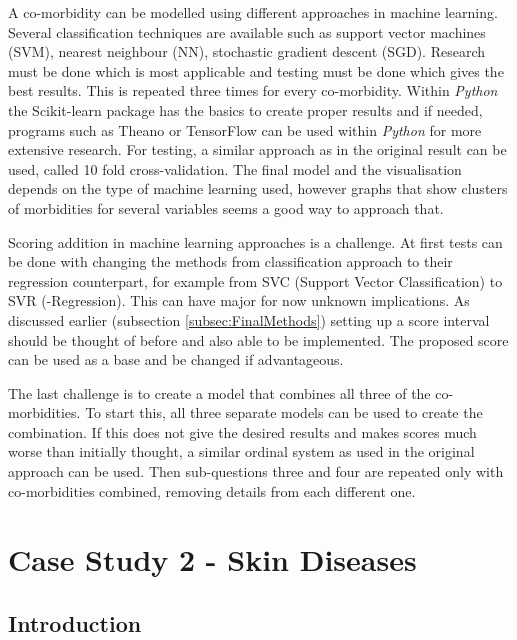 \documentclass[10pt,a4paper]{report}
\begin{document}
	A co-morbidity can be modelled using different approaches in machine learning. Several classification techniques are available such as support vector machines (SVM), nearest neighbour (NN), stochastic gradient descent (SGD). Research must be done which is most applicable and testing must be done which gives the best results. This is repeated three times for every co-morbidity. Within \textit{Python} the Scikit-learn package has the basics to create proper results and if needed, programs such as Theano or TensorFlow can be used within \textit{Python} for more extensive research. For testing, a similar approach as in the original result can be used, called 10 fold cross-validation. The final model and the visualisation depends on the type of machine learning used, however graphs that show clusters of morbidities for several variables seems a good way to approach that.
	
	Scoring addition in machine learning approaches is a challenge. At first tests can be done with changing the methods from classification approach to their regression counterpart, for example from SVC (Support Vector Classification) to SVR (-Regression). This can have major for now unknown implications. As discussed earlier (subsection \ref{subsec:FinalMethods}) setting up a score interval should be thought of before and also able to be implemented. The proposed score can be used as a base and be changed if advantageous.
	
	The last challenge is to create a model that combines all three of the co-morbidities. To start this, all three separate models can be used to create the combination. If this does not give the desired results and makes scores much worse than initially thought, a similar ordinal system as used in the original approach can be used. Then sub-questions three and four are repeated only with co-morbidities combined, removing details from each different one.
	
	\chapter{Case Study 2 - Skin Diseases}
	\label{app:CS2}
	
	\section{Introduction}
	\label{sec:Introduction}
		
\end{document}
